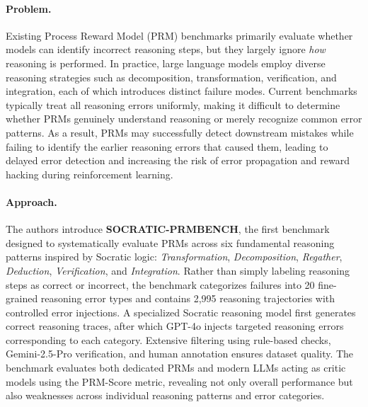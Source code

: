 \documentclass[11pt]{article}
\begin{document}
\paragraph{Problem.}
Existing Process Reward Model (PRM) benchmarks primarily evaluate whether models can identify incorrect reasoning steps, but they largely ignore \emph{how} reasoning is performed. In practice, large language models employ diverse reasoning strategies such as decomposition, transformation, verification, and integration, each of which introduces distinct failure modes. Current benchmarks typically treat all reasoning errors uniformly, making it difficult to determine whether PRMs genuinely understand reasoning or merely recognize common error patterns. As a result, PRMs may successfully detect downstream mistakes while failing to identify the earlier reasoning errors that caused them, leading to delayed error detection and increasing the risk of error propagation and reward hacking during reinforcement learning.  

\paragraph{Approach.}
The authors introduce \textbf{SOCRATIC-PRMBENCH}, the first benchmark designed to systematically evaluate PRMs across six fundamental reasoning patterns inspired by Socratic logic: \emph{Transformation}, \emph{Decomposition}, \emph{Regather}, \emph{Deduction}, \emph{Verification}, and \emph{Integration}. Rather than simply labeling reasoning steps as correct or incorrect, the benchmark categorizes failures into 20 fine-grained reasoning error types and contains 2,995 reasoning trajectories with controlled error injections. A specialized Socratic reasoning model first generates correct reasoning traces, after which GPT-4o injects targeted reasoning errors corresponding to each category. Extensive filtering using rule-based checks, Gemini-2.5-Pro verification, and human annotation ensures dataset quality. The benchmark evaluates both dedicated PRMs and modern LLMs acting as critic models using the PRM-Score metric, revealing not only overall performance but also weaknesses across individual reasoning patterns and error categories.  
\end{document}
